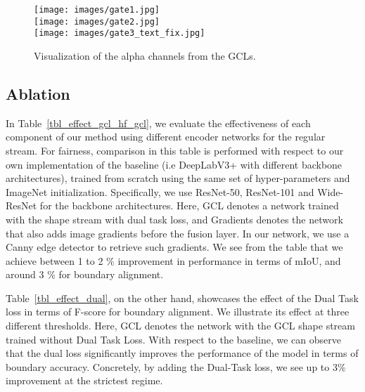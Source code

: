 \documentclass[10pt,twocolumn,letterpaper]{article}
\begin{document}
\begin{figure}[t!]
 
\centering
\texttt{[image: images/gate1.jpg]}\\ 
\texttt{[image: images/gate2.jpg]}\\
\texttt{[image: images/gate3\_text\_fix.jpg]}
\vspace{-6mm}
\caption{Visualization of the alpha channels from the GCLs.}
\label{fig:gates}
\vspace{-3mm}
\end{figure}

\subsection{Ablation}
In Table~\ref{tbl_effect_gcl_hf_gcl}, we evaluate the effectiveness of each component of our method using different encoder networks for the regular stream. For fairness, comparison in this table is performed with respect to our own implementation of the baseline (i.e DeepLabV3+ with different backbone architectures), trained from scratch using the same set of hyper-parameters and ImageNet initialization. Specifically, we use ResNet-50, ResNet-101 and Wide-ResNet for the backbone architectures. Here, GCL denotes a network trained with the shape stream with dual task loss, and Gradients denotes the network that also adds image gradients before the fusion layer. In our network, we use a Canny edge detector to retrieve such gradients. We see from the table that we achieve between  1 to 2 \% improvement in performance in terms of mIoU, and around  3 \% 
 for boundary alignment.

Table~\ref{tbl_effect_dual}, on the other hand, showcases the effect of the Dual Task loss in terms of  F-score for boundary alignment. We illustrate its effect at three different thresholds. Here, GCL denotes the network with the GCL shape stream trained without Dual Task Loss.
With respect to the baseline, we can observe that 
the dual loss significantly improves the performance of the model in terms of boundary accuracy.
Concretely, by adding the Dual-Task loss, we see up to 3\% improvement at the strictest regime. 
\end{document}
